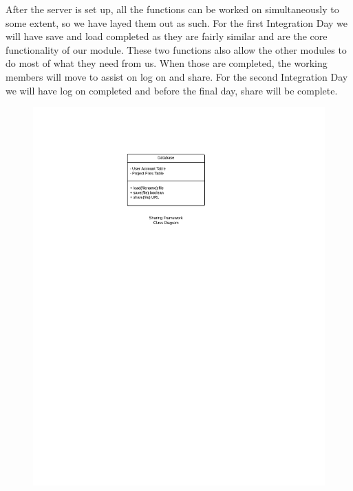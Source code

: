 \documentclass[12pt]{article}
\begin{document}
After the server is set up, all the functions can be worked on simultaneously to some extent, so we have layed them out as such. For the first Integration Day we will have save and load completed as they are fairly similar and are the core functionality of our module. These two functions also allow the other modules to do most of what they need from us. When those are completed, the working members will move to assist on log on and share. For the second Integration Day we will have log on completed and before the final day, share will be complete.
\newpage

\begin{figure}
 \centerline{\includegraphics{sharingframework-uml.pdf}}
\end{figure}
\end{document}
